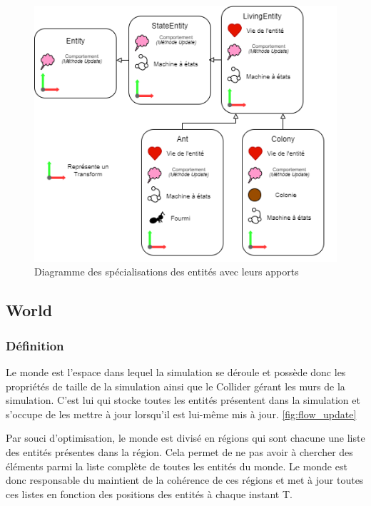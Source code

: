 \documentclass{EPUProjetDi}
\begin{document}
\begin{figure}[h]
    \centering
    \includegraphics[scale=0.5]{entities_specialisations.png}
    \caption{Diagramme des spécialisations des entités avec leurs apports}
    \label{fig:struct_entities_spec}
\end{figure}

\subsection{World}

\subsubsection*{Définition}

Le monde est l'espace dans lequel la simulation se déroule et possède donc les propriétés de taille de la simulation ainsi que le Collider
gérant les murs de la simulation.
C'est lui qui stocke toutes les entités présentent dans la simulation et s'occupe de les mettre à jour lorsqu'il est lui-même mis à jour. 
\ref{fig:flow_update}

Par souci d'optimisation, le monde est divisé en régions qui sont chacune une liste des entités présentes dans la région. 
Cela permet de ne pas avoir à chercher des éléments parmi la liste complète de toutes les entités du monde.
Le monde est donc responsable du maintient de la cohérence de ces régions et met à jour toutes ces listes en fonction des positions
des entités à chaque instant T.
\end{document}
